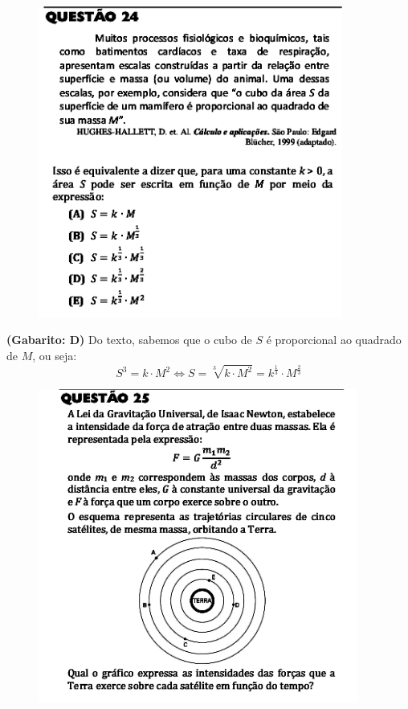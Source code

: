 \documentclass[a4paper]{article}
\begin{document}
\begin{figure}[H]
	\begin{center}
		\includegraphics[width=10cm]{L2Q24.png}
	\end{center}
\end{figure}
\par\textbf{(Gabarito: D)} Do texto, sabemos que o cubo de $S$ é proporcional ao quadrado de $M$, ou seja:
\begin{equation*}
S^3 = k\cdot M^2 \iff S = \sqrt[3]{k\cdot M^2} = k^{\frac{1}{3}}\cdot M^{\frac{2}{3}}
\end{equation*}
\begin{figure}[H]
	\begin{center}
		\includegraphics[width=10.5cm]{L2Q25_1.png}
	\end{center}
\end{figure}
\end{document}
